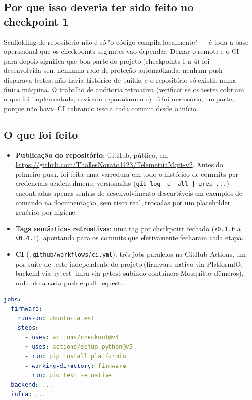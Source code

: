 \documentclass[11pt,a4paper]{article}
\begin{document}
\subsection{Por que isso deveria ter sido feito no checkpoint 1}

Scaffolding de repositório não é só "o código compila localmente" --- é toda a base operacional que os checkpoints seguintes vão depender. Deixar o remote e o CI para depois significa que boa parte do projeto (checkpoints 1 a 4) foi desenvolvida sem nenhuma rede de proteção automatizada: nenhum push disparava testes, não havia histórico de builds, e o repositório só existia numa única máquina. O trabalho de auditoria retroativa (verificar se os testes cobriam o que foi implementado, revisado separadamente) só foi necessário, em parte, porque não havia CI cobrando isso a cada commit desde o início.

\subsection{O que foi feito}

\begin{itemize}
    \item \textbf{Publicação do repositório}: GitHub, público, em \url{https://github.com/ThallesNonato1123/TelemetriaMqtt-v2}. Antes do primeiro push, foi feita uma varredura em todo o histórico de commits por credenciais acidentalmente versionadas (\texttt{git log -p --all | grep ...}) --- encontradas apenas senhas de desenvolvimento descartáveis em exemplos de comando na documentação, sem risco real, trocadas por um placeholder genérico por higiene.
    \item \textbf{Tags semânticas retroativas}: uma tag por checkpoint fechado (\texttt{v0.1.0} a \texttt{v0.4.1}), apontando para os commits que efetivamente fecharam cada etapa.
    \item \textbf{CI} (\texttt{.github/workflows/ci.yml}): três jobs paralelos no GitHub Actions, um por suíte de teste independente do projeto (firmware nativo via PlatformIO, backend via pytest, infra via pytest subindo containers Mosquitto efêmeros), rodando a cada push e pull request.
\end{itemize}

\begin{lstlisting}[language=yaml,caption={Trecho de .github/workflows/ci.yml}]
jobs:
  firmware:
    runs-on: ubuntu-latest
    steps:
      - uses: actions/checkout@v4
      - uses: actions/setup-python@v5
      - run: pip install platformio
      - working-directory: firmware
        run: pio test -e native
  backend: ...
  infra: ...
\end{lstlisting}
\end{document}
